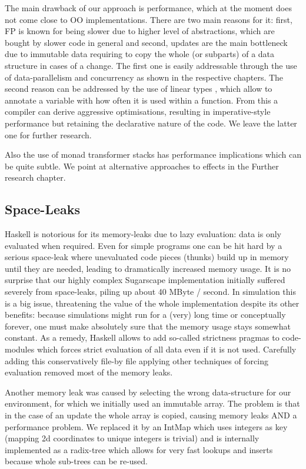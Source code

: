 The main drawback of our approach is performance, which at the moment does not come close to OO implementations. There are two main reasons for it: first, FP is known for being slower due to higher level of abstractions, which are bought by slower code in general and second, updates are the main bottleneck due to immutable data requiring to copy the whole (or subparts) of a data structure in cases of a change. The first one is easily addressable through the use of data-parallelism and concurrency as shown in the respective chapters. The second reason can be addressed by the use of linear types \cite{bernardy_linear_2017}, which allow to annotate a variable with how often it is used within a function. From this a compiler can derive aggressive optimisations, resulting in imperative-style performance but retaining the declarative nature of the code. We leave the latter one for further research.

Also the use of monad transformer stacks has performance implications which can be quite subtle. We point at alternative approaches to effects in the Further research chapter.

\subsection{Space-Leaks}
Haskell is notorious for its memory-leaks due to lazy evaluation: data is only evaluated when required. Even for simple programs one can be hit hard by a serious space-leak where unevaluated code pieces (thunks) build up in memory until they are needed, leading to dramatically increased memory usage. It is no surprise that our highly complex Sugarscape implementation initially suffered severely from space-leaks, piling up about 40 MByte / second. In simulation this is a big issue, threatening the value of the whole implementation despite its other benefits: because simulations might run for a (very) long time or conceptually forever, one must make absolutely sure that the memory usage stays somewhat constant. As a remedy, Haskell allows to add so-called strictness pragmas to code-modules which forces strict evaluation of all data even if it is not used. Carefully adding this conservatively file-by file applying other techniques of forcing evaluation removed most of the memory leaks.

Another memory leak was caused by selecting the wrong data-structure for our environment, for which we initially used an immutable array. The problem is that in the case of an update the whole array is copied, causing memory leaks AND a performance problem. We replaced it by an IntMap which uses integers as key (mapping 2d coordinates to unique integers is trivial) and is internally implemented as a radix-tree which allows for very fast lookups and inserts because whole sub-trees can be re-used.

